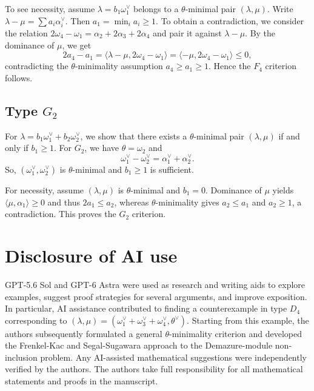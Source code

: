 \documentclass[a4paper, 12pt]{amsart}
\theoremstyle{definition}
\begin{document}
To see necessity, assume $\lambda=b_1\omega_1^\vee$ belongs to a $\theta$-minimal pair $(\lambda, \mu)$. Write $\lambda-\mu = \sum a_i \alpha_i^{\vee}$.  Then $a_1=\min_i a_i\ge1$. To obtain a contradiction, we consider the  relation 
$2\omega_4-\omega_1=\alpha_2+2\alpha_3+2\alpha_4$ and pair it against $\lambda-\mu $. 
By the dominance of  $\mu$, we get 
\[
2a_4-a_1
=\langle\lambda-\mu,2\omega_4-\omega_1\rangle = \langle -\mu,2\omega_4-\omega_1\rangle 
\le0,
\]
contradicting the $\theta$-minimality assumption $a_4\ge a_1\geq 1$. Hence the $F_4$ criterion follows.
\subsection{Type $G_2$} For $\lambda = b_1 \omega_1^{\vee} +b_2 \omega_2^{\vee}$, we show that there exists a $\theta$-minimal pair $(\lambda, \mu)$ if and only if $b_1 \geq 1$.
For $G_2$, we have $\theta=\omega_2$ and
\[
\omega_1^\vee-\omega_2^\vee=\alpha_1^\vee+\alpha_2^\vee.
\]
So, $(\omega_1^{\vee}, \omega_2^{\vee})$ is $\theta$-minimal and $b_1\ge1$ is sufficient. 

For necessity, assume $(\lambda, \mu)$ is $\theta$-minimal and $b_1=0$. Dominance of $\mu$ yields $ \langle \mu, \alpha_1 \rangle\geq 0$ and thus $2a_1\le a_2$, whereas $\theta$-minimality gives $a_2\le a_1$ and $a_2\ge1$, a contradiction. This proves the $G_2$ criterion.


\section*{Disclosure of AI use}
GPT-5.6 Sol and GPT-6 Astra were used as research and writing aids to explore examples, suggest proof strategies for several arguments, and improve exposition.  In particular, AI assistance contributed to finding a counterexample in type $D_4$ corresponding to $(\lambda,\mu)=(\omega_1^\vee+\omega_3^\vee+\omega_4^\vee,\theta^\vee)$. Starting from this example,  the authors subsequently formulated a general  $\theta$-minimality criterion and developed the Frenkel-Kac and Segal-Sugawara approach to the Demazure-module non-inclusion problem.  Any AI-assisted mathematical suggestions were independently verified by the authors. The authors take full responsibility for all mathematical statements and proofs in the manuscript.  
\end{document}
